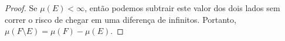\begin{proof}
    Se $\mu(E)<\infty$, então podemos subtrair este valor dos dois lados sem correr o risco de chegar em uma diferença de infinitos. Portanto, $\mu (F \setminus E) = \mu (F) - \mu (E)$.
\end{proof}